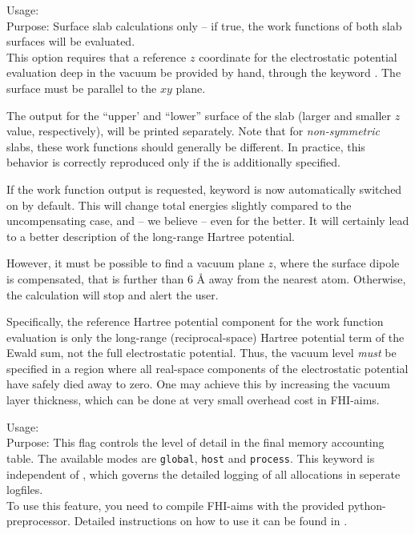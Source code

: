 {
  \noindent
  Usage:   \\[1.0ex]
  Purpose: Surface slab calculations only -- if true, the work functions of
  both slab surfaces will be evaluated.
 \\[1.0ex]
}
%
This option requires that a reference $z$ coordinate for the electrostatic
potential evaluation deep in the vacuum be provided by hand, through the
keyword . The surface must be parallel to the $xy$
plane. 

The output for the ``upper' and ``lower'' surface of the slab (larger and
smaller $z$ value, respectively), will be printed separately. Note that for
\emph{non-symmetric} slabs, these work functions should generally be
different. In practice, this behavior is correctly reproduced only if the
 is additionally specified.

If the work function output is requested, keyword
 is now automatically switched
on by default. This will change total energies slightly compared to
the uncompensating case, and -- we believe -- even for the better. It will
certainly lead to a better description of the long-range Hartree potential.

However, it must be possible to find a vacuum plane $z$, where the
surface dipole is compensated, that is further than 6 {\AA} away from
the nearest atom. Otherwise, the calculation will stop and alert the user.

Specifically, the reference Hartree potential component for the work function
evaluation is only the long-range (reciprocal-space) Hartree potential term of
the Ewald sum, not the full electrostatic potential. Thus, the vacuum level
\emph{must} be specified in a region where all real-space components of the
electrostatic potential have safely died away to zero. One may achieve this by
increasing the vacuum layer thickness, which can be done at very small
overhead cost in FHI-aims.


{
  \noindent
  Usage:   \\[1.0ex]
  Purpose: This flag controls the level of detail in the final memory accounting table.
  The available modes are \texttt{global}, \texttt{host} and \texttt{process}. This
  keyword is independent of , which governs the detailed logging
  of all allocations in seperate logfiles.\\[1.0ex]
}
To use this feature, you need to compile FHI-aims with the provided python-preprocessor.
Detailed instructions on how to use it can be found in .

